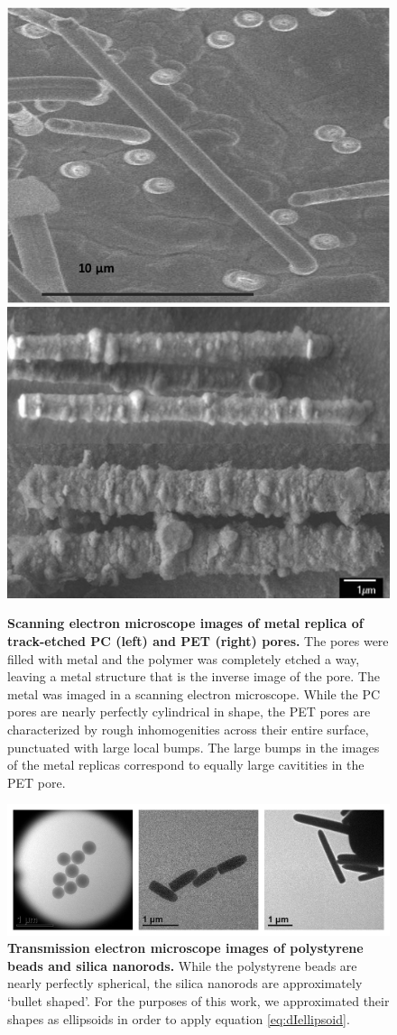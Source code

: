 		\begin{figure}
			\hfill
			\includegraphics[height=0.35\textwidth]{PC}
			\hfill
			\includegraphics[height=0.35\textwidth]{PET}
			\hfill
			\caption{\textbf{Scanning electron microscope images of metal replica of track-etched PC (left) and PET (right) pores.} The pores were filled with metal and the polymer was completely etched a way, leaving a metal structure that is the inverse image of the pore. The metal was imaged in a scanning electron microscope. While the PC pores are nearly perfectly cylindrical in shape, the PET pores are characterized by rough inhomogenities across their entire surface, punctuated with large local bumps. The large bumps in the images of the metal replicas correspond to equally large cavitities in the PET pore.}
			\label{fig:PCPET}
		\end{figure}
		
		\begin{figure}
			\includegraphics[width=1\textwidth]{particles}
			\caption{\textbf{Transmission electron microscope images of polystyrene beads and silica nanorods.} While the polystyrene beads are nearly perfectly spherical, the silica nanorods are approximately `bullet shaped'. For the purposes of this work, we approximated their shapes as ellipsoids in order to apply equation \ref{eq:dIellipsoid}.}
			\label{fig:particles}
		\end{figure}


